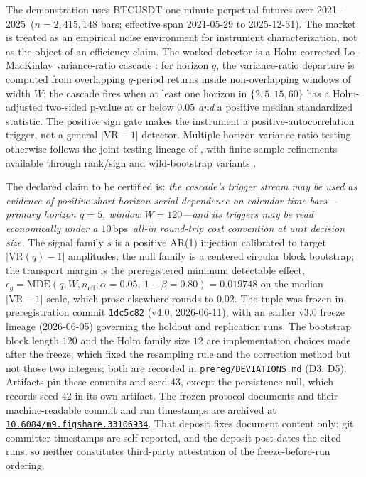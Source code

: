 \documentclass[3p]{elsarticle}
\newcommand{\VR}{\ensuremath{\mathrm{VR}}}
\newcommand{\bps}{\ensuremath{\mathrm{bps}}}
\newcommand{\epsg}{\ensuremath{\epsilon_g}}
\newcommand{\dataspan}{2021--2025}
\newcommand{\numbars}{2{,}415{,}148}
\begin{document}
The demonstration uses BTCUSDT one-minute perpetual futures over \dataspan\
($n=\numbars$ bars; effective span 2021-05-29 to 2025-12-31). The market is
treated as an empirical noise environment for instrument characterization,
not as the object of an efficiency claim. The worked detector is a
Holm-corrected Lo--MacKinlay variance-ratio cascade
\citep{LoMacKinlay1988,LoMacKinlay1989,Holm1979}: for horizon $q$, the
variance-ratio departure is computed from overlapping $q$-period returns
inside non-overlapping windows of width $W$; the cascade fires when at least
one horizon in $\{2,5,15,60\}$ has a Holm-adjusted two-sided p-value at or
below $0.05$ \emph{and} a positive median standardized statistic. The
positive sign gate makes the instrument a positive-autocorrelation trigger,
not a general $|\VR-1|$ detector. Multiple-horizon variance-ratio testing
otherwise follows the joint-testing lineage of \citet{ChowDenning1993}, with
finite-sample refinements available through rank/sign and wild-bootstrap
variants \citep{Wright2000,Kim2006}.

The declared claim to be certified is: \emph{the cascade's trigger stream may
be used as evidence of positive short-horizon serial dependence on
calendar-time bars---primary horizon $q{=}5$, window $W{=}120$---and its
triggers may be read economically under a $10$\,\bps\ all-in round-trip cost
convention at unit decision size.} The signal family $s$ is a positive AR(1)
injection calibrated to target $|\VR(q)-1|$ amplitudes; the null family is a
centered circular block bootstrap; the transport margin is the preregistered
minimum detectable effect, $\epsg=\mathrm{MDE}(q,W,n_{\mathrm{eff}};
\alpha{=}0.05,\ 1{-}\beta{=}0.80)=0.019748$ on the median $|\VR-1|$ scale,
which prose elsewhere rounds to $0.02$. The tuple was frozen in
preregistration commit \texttt{1dc5c82} (v4.0, 2026-06-11), with an earlier
v3.0 freeze lineage (2026-06-05) governing the holdout and replication runs.
The bootstrap block length $120$ and the Holm family size $12$ are
implementation choices made after the freeze, which fixed the resampling rule
and the correction method but not those two integers; both are recorded in
\texttt{prereg/DEVIATIONS.md} (D3, D5). Artifacts pin these commits and seed
$43$, except the persistence null, which records seed $42$ in its own
artifact. The frozen protocol documents
and their machine-readable commit and run timestamps are archived at
\href{https://doi.org/10.6084/m9.figshare.33106934}{\texttt{10.6084/m9.figshare.33106934}}.
That deposit fixes document content only: git committer timestamps are
self-reported, and the deposit post-dates the cited runs, so neither
constitutes third-party attestation of the freeze-before-run ordering.
\end{document}
